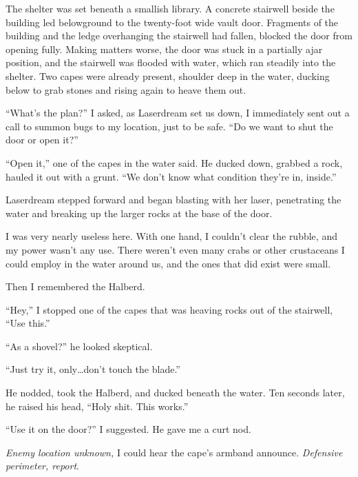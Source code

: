 The shelter was set beneath a smallish library.  A concrete stairwell beside the building led belowground to the twenty-foot wide vault door.  Fragments of the building and the ledge overhanging the stairwell had fallen, blocked the door from opening fully.  Making matters worse, the door was stuck in a partially ajar position, and the stairwell was flooded with water, which ran steadily into the shelter.  Two capes were already present, shoulder deep in the water, ducking below to grab stones and rising again to heave them out.



``What's the plan?'' I asked, as Laserdream set us down, I immediately sent out a call to summon bugs to my location, just to be safe.  ``Do we want to shut the door or open it?''



``Open it,'' one of the capes in the water said.  He ducked down, grabbed a rock, hauled it out with a grunt.  ``We don't know what condition they're in, inside.''



Laserdream stepped forward and began blasting with her laser, penetrating the water and breaking up the larger rocks at the base of the door.



I was very nearly useless here.  With one hand, I couldn't clear the rubble, and my power wasn't any use.  There weren't even many crabs or other crustaceans I could employ in the water around us, and the ones that did exist were small.



Then I remembered the Halberd.



``Hey,'' I stopped one of the capes that was heaving rocks out of the stairwell, ``Use this.''



``As a shovel?'' he looked skeptical.



``Just try it, only\ldots don't touch the blade.''



He nodded, took the Halberd, and ducked beneath the water.  Ten seconds later, he raised his head, ``Holy shit.  This works.''



``Use it on the door?'' I suggested.  He gave me a curt nod.



\emph{Enemy location unknown, }I could hear the cape's armband announce.  \emph{Defensive perimeter, report}.



